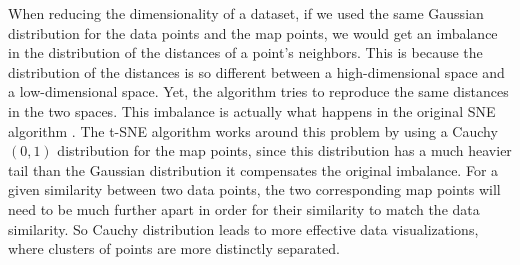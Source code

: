 \documentclass[11pt]{article}
\theoremstyle{definition}
\theoremstyle{remark}
\begin{document}
{When reducing the dimensionality of a dataset, if we used the same Gaussian distribution for the data points and the map points, we would get an imbalance in the distribution of the distances of a point's neighbors. This is because the distribution of the distances is so different between a high-dimensional space and a low-dimensional space. Yet, the algorithm tries to reproduce the same distances in the two spaces. This imbalance is actually what happens in the original SNE algorithm \cite{hinton2003stochastic}.
The t-SNE algorithm works around this problem by using a Cauchy $(0,1)$ distribution for the map points, since this distribution has a much heavier tail than the Gaussian distribution it compensates the original imbalance. For a given similarity between two data points, the two corresponding map points will need to be much further apart in order for their similarity to match the data similarity. So Cauchy distribution leads to more effective data visualizations, where clusters of points are more distinctly separated.


}
\end{document}
